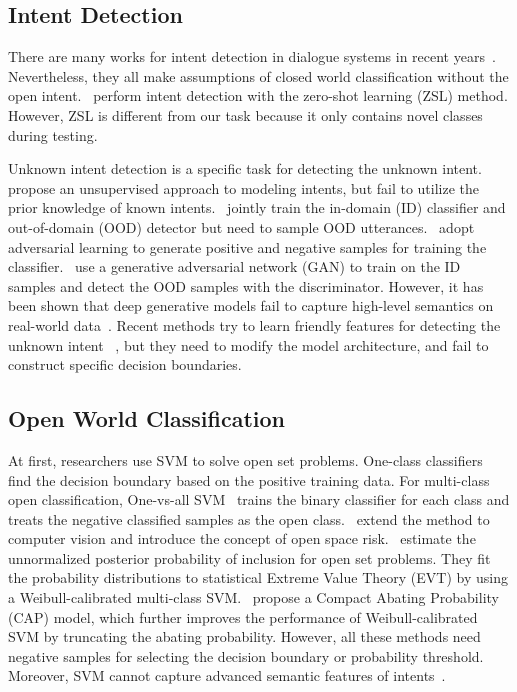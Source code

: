 \documentclass[letterpaper]{article} %
\begin{document}
	\subsection{Intent Detection} 
	There are many works for intent detection in dialogue systems in recent years~\cite{ijcai2020-532,Qin_Che_Li_Ni_Liu_2020,zhang-etal-2019-joint,e-etal-2019-novel,qin-etal-2019-stack}. Nevertheless, they all make assumptions of closed world classification without the open intent.~\citet{srivastava-etal-2018-zero} perform intent detection with the zero-shot learning (ZSL) method. However, ZSL is different from our task because it only contains novel classes during testing. 
	
	Unknown intent detection is a specific task for detecting the unknown intent.~\citet{Brychcin2017UnsupervisedDA} propose an unsupervised approach to modeling intents,  but fail to utilize the prior knowledge of known intents.~\citet{Kim2018JointLO} jointly train the in-domain (ID) classifier and out-of-domain (OOD) detector but need to sample OOD utterances.~\citet{Yu2017OpenCategoryCB} adopt adversarial learning to generate positive and negative samples for training the classifier.~\citet{ryu-etal-2018-domain} use a generative adversarial network (GAN) to train on the ID samples and detect the OOD samples with the discriminator. However, it has been shown that deep generative models fail to capture high-level semantics on real-world data~\cite{2018arXiv181009136N,Mundt_2019_ICCV}. Recent methods try to learn friendly features for detecting the unknown intent ~\cite{lin-xu-2019-deep,gangal2020likelihood,yan-etal-2020-unknown}, but they need to modify the  model architecture, and fail to construct specific decision boundaries.
	
	\subsection{Open World Classification}
	At first, researchers use SVM to solve open set problems. One-class classifiers~\cite{scholkopf2001estimating,SVDD} find the decision boundary based on the positive training data. For multi-class open classification, One-vs-all SVM~\cite{Rifkin2004In} trains the binary classifier for each class and treats the negative classified samples as the open class.~\citet{scheirer2013toward} extend the method to computer vision and introduce the concept of open space risk.~\citet{Jain_2014_ECCV} estimate the unnormalized posterior probability of inclusion for open set problems. They fit the probability distributions to statistical Extreme Value Theory (EVT) by using a Weibull-calibrated multi-class SVM.~\citet{Scheirer_2014_TPAMIb} propose a Compact Abating Probability (CAP) model, which further improves the performance of Weibull-calibrated SVM by truncating the abating probability. However, all these methods need negative samples for selecting the decision boundary or probability threshold. Moreover, SVM cannot capture  advanced semantic features of intents~\cite{lin2019post}.
	
\end{document}
